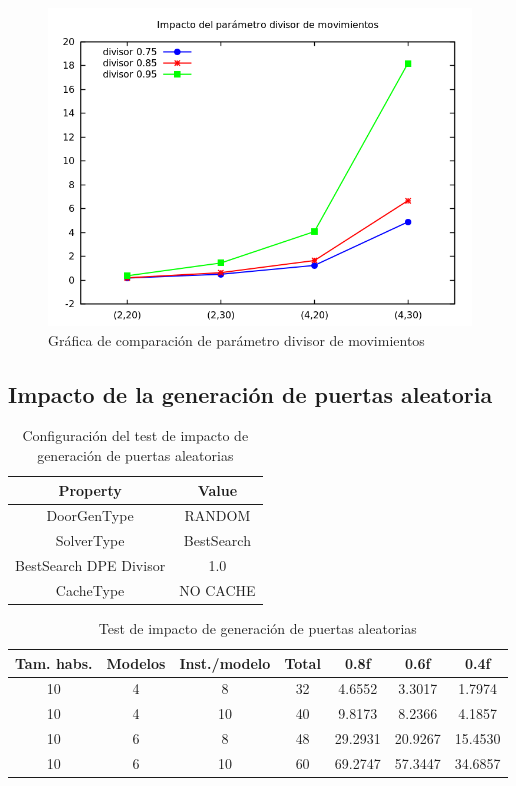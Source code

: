 \begin{figure}[H]
\centering
\includegraphics[scale=0.5]{img/dpedivs}
\caption{Gráfica de comparación de parámetro divisor de movimientos
\label{fig:grfdpedivs}}
\end{figure}



\subsection{Impacto de la generación de puertas aleatoria}

\begin{table}[H]
\begin{center}
	\begin{tabular}{ | c | c | }
\hline
 		Property & Value \\ \hline
DoorGenType & RANDOM \\ 
SolverType & BestSearch \\ 
BestSearch DPE Divisor & 1.0 \\ 
CacheType & NO CACHE \\ 
\hline
	\end{tabular}
\end{center}
\caption{Configuración del test de impacto de generación de puertas aleatorias}
\label{table:cfg-randoors}
\end{table}


\begin{table}[H]
\begin{center}
	\begin{tabular}{ | c | c | c | c | c | c | c | }
\hline
Tam. habs. & Modelos & Inst./modelo & Total & 0.8f & 0.6f & 0.4f \\ \hline 
10 & 4 & 8 & 32 & 4.6552 & 3.3017 & 1.7974 \\ 
10 & 4 & 10 & 40 & 9.8173 & 8.2366 & 4.1857 \\ 
10 & 6 & 8 & 48 & 29.2931 & 20.9267 & 15.4530 \\ 
10 & 6 & 10 & 60 & 69.2747 & 57.3447 & 34.6857 \\ 
\hline
	\end{tabular}
\end{center}
\caption{Test de impacto de generación de puertas aleatorias}
\label{table:randoors}
\end{table}


